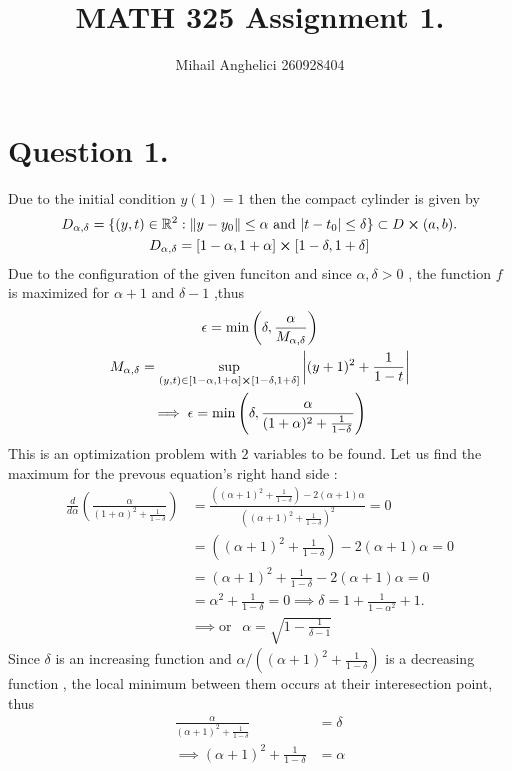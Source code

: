 \documentclass[
	12pt,
	]{article}
\title{MATH 325 Assignment 1.}
\author{Mihail Anghelici 260928404}
\date{\empty}
\newcommand{\R}{\mathbb{R}}
\DeclarePairedDelimiter{\norm}{\lVert}{\rVert}
\theoremstyle{definition}
\theoremstyle{definition}
\theoremstyle{definition}
\theoremstyle{definition}
\theoremstyle{definition}
\theoremstyle{example}
\theoremstyle{note}
\theoremstyle{remark}
\theoremstyle{example}
\begin{document}
	\maketitle
	\section{Question 1.}
		Due to the initial condition $y(1) =1$ then the compact cylinder is given by 
		\begin{gather*}
			D_{\alpha, \delta} = \{(y,t) \in \R^{2} : \norm{y - y_{0}} \le \alpha \ \text{and} \ \abs{t- t_{0}} \le \delta\} \subset D \cross (a,b).  \\
			D_{\alpha, \delta} = [1-\alpha, 1+\alpha] \cross [1-\delta, 1+\delta]
		\end{gather*}
		Due to the configuration of the given funciton and since $\alpha, \delta > 0$ , the function $f$ is maximized for $\alpha+1$ and $\delta -1$ ,thus 
		\begin{gather*}
			\epsilon = \min\left(\delta, \frac{\alpha}{M_{\alpha,\delta}}\right) \\
			M_{\alpha, \delta} = \sup_{(y,t) \in [1-\alpha, 1+\alpha] \cross [1-\delta, 1+\delta]} \abs{(y+1)^{2} +\frac{1}{1-t}}\\
			\implies \epsilon = \min\left(\delta, \frac{\alpha}{(1+\alpha)^{2}+\frac{1}{1-\delta}}\right)
		\end{gather*}
		This is an optimization problem with $2$ variables to be found. Let us find the maximum for the prevous equation's right hand side :
		\begin{align*}
			\frac{d}{d\alpha}\left(\frac{\alpha}{(1+\alpha)^{2} + \frac{1}{1-\delta}}\right) &= \frac{\left((\alpha+1)^{2} + \frac{1}{1-\delta}\right) - 2(\alpha +1)\alpha}{\left((\alpha+1)^{2} + \frac{1}{1-\delta}\right)^{2}} = 0 \\
			&= \left((\alpha+1)^{2} + \frac{1}{1-\delta}\right) - 2(\alpha +1)\alpha = 0 \\
			&= (\alpha+1)^{2} + \frac{1}{1-\delta} -2(\alpha+1)\alpha = 0 \\
			&= \alpha^{2} + \frac{1}{1-\delta} = 0 \implies \delta = 1 + \frac{1}{1-\alpha^{2}} +1 .\\
			& \implies \text{or } \ \ \alpha = \sqrt{1-\frac{1}{\delta-1}}
		\end{align*}
		Since $\delta$ is an increasing function and $\alpha / ((\alpha+1)^{2} + \frac{1}{1-\delta})$ is a decreasing function , the local minimum between them occurs at their interesection point, thus 
		\begin{align*}
			\frac{\alpha}{(\alpha+1)^{2} + \frac{1}{1-\delta}} &= \delta \\
			\implies (\alpha+1)^{2} + \frac{1}{1-\delta} &= \alpha
		\end{align*}
\end{document}
